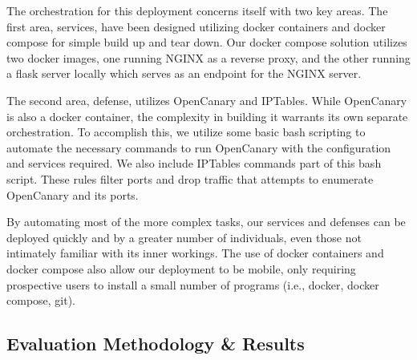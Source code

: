 The orchestration for this deployment concerns itself with two key areas. The first area, services, 
have been designed utilizing docker containers and docker compose for simple build up and tear down. 
Our docker compose solution utilizes two docker images, one running NGINX as a reverse proxy, 
and the other running a flask server locally which serves as an endpoint for the NGINX server. 

The second area, defense, utilizes OpenCanary and IPTables. While OpenCanary is also a docker container, the 
complexity in building it warrants its own separate orchestration. To accomplish this, we utilize 
some basic bash scripting to automate the necessary commands to run OpenCanary with the configuration and 
services required. We also include IPTables commands part of this bash script. These rules filter ports and 
drop traffic that attempts to enumerate OpenCanary and its ports. 

By automating most of the more complex tasks, our services and defenses can be deployed quickly 
and by a greater number of individuals, even those not intimately familiar with its inner workings. 
The use of docker containers and docker compose also allow our deployment to be mobile, only requiring 
prospective users to install a small number of programs (i.e., docker, docker compose, git). 

\subsection{Evaluation Methodology \& Results}

